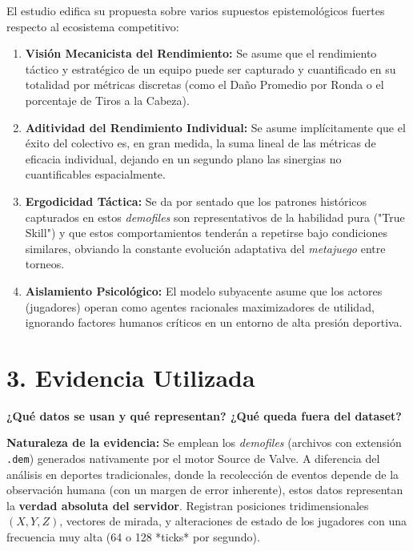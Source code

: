 \documentclass[12pt,a4paper]{article}
\begin{document}
El estudio edifica su propuesta sobre varios supuestos epistemológicos fuertes respecto al ecosistema competitivo:
\begin{enumerate}[label=\alph*)]
    \item \textbf{Visión Mecanicista del Rendimiento:} Se asume que el rendimiento táctico y estratégico de un equipo puede ser capturado y cuantificado en su totalidad por métricas discretas (como el Daño Promedio por Ronda o el porcentaje de Tiros a la Cabeza). 
    \item \textbf{Aditividad del Rendimiento Individual:} Se asume implícitamente que el éxito del colectivo es, en gran medida, la suma lineal de las métricas de eficacia individual, dejando en un segundo plano las sinergias no cuantificables espacialmente.
    \item \textbf{Ergodicidad Táctica:} Se da por sentado que los patrones históricos capturados en estos \textit{demofiles} son representativos de la habilidad pura ("True Skill") y que estos comportamientos tenderán a repetirse bajo condiciones similares, obviando la constante evolución adaptativa del \textit{metajuego} entre torneos.
    \item \textbf{Aislamiento Psicológico:} El modelo subyacente asume que los actores (jugadores) operan como agentes racionales maximizadores de utilidad, ignorando factores humanos críticos en un entorno de alta presión deportiva.
\end{enumerate}

\section*{3. Evidencia Utilizada}
\textbf{¿Qué datos se usan y qué representan? ¿Qué queda fuera del dataset?}

\textbf{Naturaleza de la evidencia:} Se emplean los \textit{demofiles} (archivos con extensión \texttt{.dem}) generados nativamente por el motor Source de Valve. A diferencia del análisis en deportes tradicionales, donde la recolección de eventos depende de la observación humana (con un margen de error inherente), estos datos representan la \textbf{verdad absoluta del servidor}. Registran posiciones tridimensionales $(X, Y, Z)$, vectores de mirada, y alteraciones de estado de los jugadores con una frecuencia muy alta (64 o 128 *ticks* por segundo).
\end{document}
